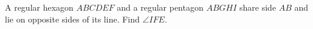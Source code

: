 A regular hexagon $ABCDEF$ and a regular pentagon $ABGHI$ share side $AB$ and lie on opposite sides of its line. Find $\angle IFE$.
